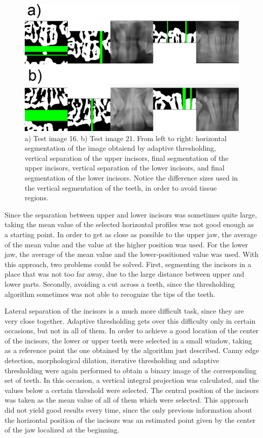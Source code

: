 \documentclass[a4paper,11pt,twoside]{article}
\begin{document}
\begin{figure}[h]
\centering
\includegraphics[width=0.95\columnwidth]{jawSegmentation2.png}
\caption{a) Test image 16. b) Test image 21. From left to right: horizontal segmentation of the image obtaiend by adaptive thresholding, vertical separation of the upper incisors, final segmentation of the upper incisors, vertical separation of the lower incisors, and final segmentation of the lower incisors. Notice the difference sizes used in the vertical segmentation of the teeth, in order to avoid tissue regions.}
\label{jawSegmentation}
\end{figure}

Since the separation between upper and lower incisors was sometimes quite large, taking the mean value of the selected horizontal profiles was not  good enough as a starting point. In order to get as close as possible to the upper jaw, the average of the mean value and the value at the higher position was used. For the lower jaw, the average of the mean value and the lower-positioned value was used. With this approach, two problems could be solved. First, segmenting the incisors in a place that was not too far away, due to the large distance between upper and lower parts. Secondly, avoiding a cut across a teeth, since the thresholding algorithm sometimes was not able to recognize the tips of the teeth. 


Lateral separation of the incisors is a much more difficult task, since they are very close together. Adaptive thresholding gets over this difficulty only in certain occasions, but not in all of them. In order to achieve a good location of the center of the incisors, the lower or upper teeth were selected in a small window, taking as a reference point the one obtained by the algorithm just described. Canny edge detection, morphological dilation, iterative thresholding and adaptive thresholding were again performed to obtain a binary image of the corresponding set of teeth. In this occasion, a vertical integral projection was calculated, and the values below a certain threshold were selected. The central position of the incisors was taken as the mean value of all of them which were selected. This approach did not yield good results every time, since the only previous information about the horizontal position of the incisors was an estimated point given by the center of the jaw localized at the beginning.
\end{document}
